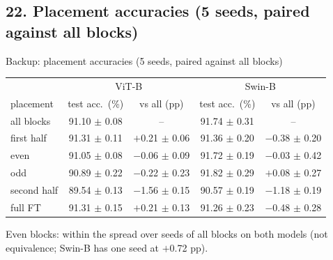 \documentclass[aspectratio=169,11pt]{beamer}
\begin{document}
\subsection{22. Placement accuracies (5 seeds, paired against all blocks)}
\begin{frame}{Backup: placement accuracies (5 seeds, paired against all blocks)}
\small\centering
\begin{tabular}{lcccc}
\toprule
 & \multicolumn{2}{c}{ViT-B} & \multicolumn{2}{c}{Swin-B} \\
placement & test acc.\ (\%) & vs all (pp) & test acc.\ (\%) & vs all (pp) \\
\midrule
all blocks & 91.10 $\pm$ 0.08 & -- & 91.74 $\pm$ 0.31 & -- \\
first half & 91.31 $\pm$ 0.11 & $+$0.21 $\pm$ 0.06 & 91.36 $\pm$ 0.20 & $-$0.38 $\pm$ 0.20 \\
even & 91.05 $\pm$ 0.08 & $-$0.06 $\pm$ 0.09 & 91.72 $\pm$ 0.19 & $-$0.03 $\pm$ 0.42 \\
odd & 90.89 $\pm$ 0.22 & $-$0.22 $\pm$ 0.23 & 91.82 $\pm$ 0.29 & $+$0.08 $\pm$ 0.27 \\
second half & 89.54 $\pm$ 0.13 & $-$1.56 $\pm$ 0.15 & 90.57 $\pm$ 0.19 & $-$1.18 $\pm$ 0.19 \\
full FT & 91.31 $\pm$ 0.15 & $+$0.21 $\pm$ 0.13 & 91.26 $\pm$ 0.23 & $-$0.48 $\pm$ 0.28 \\
\bottomrule
\end{tabular}
\par\medskip
Even blocks: within the spread over seeds of all blocks on both models (not equivalence; Swin-B has one seed at $+$0.72 pp).
\end{frame}
\end{document}
